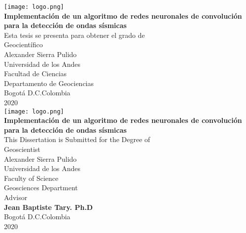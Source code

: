 \documentclass[../main.tex]{subfile}
\begin{document}
\graphicspath{ {images/Portada/} }
\setlength{\unitlength}{1 cm} %
\thispagestyle{empty}

\begin{center}
\texttt{[image: logo.png]}\\
\vspace{2cm}
\textbf{{\LARGE Implementación de un algoritmo de redes neuronales de convolución para la detección de ondas sísmicas}}\\
\vspace{2.5cm}
{\LARGE{Esta tesis se presenta para obtener el grado de}}\\
\vspace{1.0cm}
\centering
{\LARGE{Geocientífico}}\\
\vspace{2.0cm}
{\large Alexander Sierra Pulido}\\
\vspace{2.5cm}
Universidad de los Andes\\
Facultad de Ciencias\\
Departamento de Geociencias\\
\vspace{2.5cm}
Bogotá D.C.\hspace{0.1cm}Colombia\\
2020\\
\newpage
\blankpage
\thispagestyle{empty}
\texttt{[image: logo.png]}\\
\vspace{2cm}
\textbf{{\LARGE  Implementación de un algoritmo de redes neuronales de convolución para la detección de ondas sísmicas}}\\
\vspace{1.5cm}
{\LARGE{This Dissertation is Submitted for the Degree of}}\\
\vspace{1.0cm}
\centering
{\LARGE{Geoscientist}}\\
\vspace{2.0cm}
{\large Alexander Sierra Pulido}\\
\vspace{2.5cm}
Universidad de los Andes\\
Faculty of Science\\
Geosciences Department\\
\vspace{1.5cm}
Advisor\\
\textbf{\large{ Jean Baptiste Tary. Ph.D}}\\
\vspace{2.5cm}
Bogotá D.C.\hspace{0.1cm}Colombia\\
2020
\end{center}
\newpage
\blankpage
\end{document}
